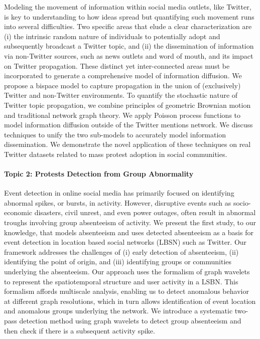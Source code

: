Modeling the movement of information within social media outlets, like
Twitter, is key to understanding to how ideas spread but quantifying such
movement runs into several difficulties. Two specific areas that elude a clear
characterization are (i) the intrinsic random nature of individuals to
potentially adopt and subsequently broadcast a Twitter topic, and (ii) the
dissemination of information via non-Twitter sources, such as news outlets
and word of mouth, and its impact on Twitter propagation. These distinct
yet inter-connected areas must be incorporated to generate a
comprehensive model of information diffusion. We propose a bispace model
to capture propagation in the union of (exclusively) Twitter and
non-Twitter environments. To quantify the stochastic nature of Twitter
topic propagation, we combine principles of geometric Brownian motion and
traditional network graph theory. We apply Poisson process functions to model
information diffusion outside of the Twitter mentions network. We discuss techniques
to unify the two sub-models to accurately model information dissemination. We
demonstrate the novel application of these techniques on real
Twitter datasets related to mass protest adoption in social communities.

\paragraph{Topic 2: Protests Detection from Group Abnormality}

Event detection in online social media has primarily focused on identifying
abnormal spikes, or bursts, in activity. However, disruptive events such as socio-economic disasters, civil unrest, and even power outages, often result in abnormal troughs involving group absenteeism of activity. We present the first study, to our knowledge, that models absenteeism and uses detected absenteeism as a basis for event detection in location based social networks (LBSN) such as Twitter. Our framework addresses the challenges of (i) early detection of absenteeism, (ii) identifying the point of origin, and (iii) identifying groups or communities underlying the absenteeism. Our approach uses the formalism of graph wavelets to represent the spatiotemporal structure and user activity in a LSBN. This formalism affords multiscale analysis, enabling us to detect anomalous behavior at different graph resolutions, which in turn allows identification of event location and anomalous groups underlying the network. We introduce a systematic two-pass detection method using graph wavelets to detect group absenteeism and then check if there is a subsequent activity spike.

